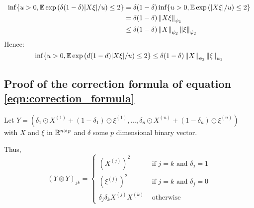 \documentclass{article}
\numberwithin{equation}{section}
\numberwithin{equation}{section}
\begin{document}
            \begin{equation}
                \begin{split}
                \inf \lbrace u> 0, \mathbb{E}\exp\left(\delta (1-\delta)\vert X \xi \vert / u \right) \leq 2 \rbrace & = \delta(1-\delta)\inf\lbrace  u > 0, \mathbb{E}\exp\left(\vert X \xi \vert / u \right) \leq 2 \rbrace\\
                & = \delta(1-\delta) \left\Vert X \xi \right\Vert_{\psi_{1}}\\
                & \leq \delta (1-\delta) \left\Vert X \right\Vert_{\psi_{2}} \left\Vert \xi \right\Vert_{\psi_{2}}
                \end{split}
            \end{equation}
            Hence:
            \begin{equation}
                \inf \lbrace u> 0, \mathbb{E}\exp\left(d (1-d)\vert X \xi \vert / u \right) \leq 2 \rbrace \leq \delta (1-\delta) \left\Vert X \right\Vert_{\psi_{2}} \left\Vert \xi \right\Vert_{\psi_{2}}
            \end{equation}
        
        \subsection{Proof of the correction formula of equation \ref{eqn:correction_formula}}
        \label{proof:formula_contaminated}
            
        Let $Y = (\delta_1 \odot X^{(1)} + (1-\delta_1)\odot \xi^{(1)}, \dots , \delta_n \odot X^{(n)} + (1-\delta_n)\odot \xi^{(n)})$ with $X$ and $\xi$ in $\mathbb{R}^{n\times p}$ and $\delta$ some $p$ dimensional binary vector.
            
        Thus, 
        \begin{equation}
            (Y \otimes Y)_{jk} = \begin{cases}
                \left(X^{(j)}\right)^2 & \text{ if $j = k$ and $\delta_j = 1$}\\
                \left(\xi^{(j)}\right)^2 & \text{ if $j = k$ and $\delta_j = 0$}\\
                \delta_j \delta_k X^{(j)}X^{(k)}& \text{ otherwise}
            \end{cases}
        \end{equation}
            
\end{document}
